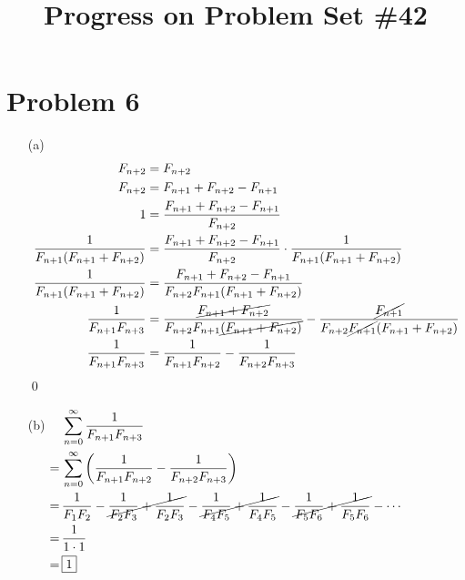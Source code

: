 \documentclass{article}
\begin{document}
\section*{Problem 6}
\begin{itemize}
\item[(a)]
\begin{align*}
	F_{n+2}&=F_{n+2} \\
	F_{n+2}&=F_{n+1}+F_{n+2}-F_{n+1} \\
	1&=\frac{F_{n+1}+F_{n+2}-F_{n+1}}{F_{n+2}} \\
	\frac{1}{F_{n+1}(F_{n+1}+F_{n+2})}&=\frac{F_{n+1}+F_{n+2}-
		F_{n+1}}{F_{n+2}}\cdot\frac{1}{F_{n+1}(F_{n+1}+F_{n+2})} \\
	\frac{1}{F_{n+1}(F_{n+1}+F_{n+2})}&=\frac{F_{n+1}+F_{n+2}-
		F_{n+1}}{F_{n+2}F_{n+1}(F_{n+1}+F_{n+2})} \\
	\frac{1}{F_{n+1}F_{n+3}}&=\frac{\cancel{F_{n+1}+F_{n+2}}}
		{F_{n+2}F_{n+1}\cancel{(F_{n+1}+F_{n+2})}}-\frac{\cancel{
		F_{n+1}}}{F_{n+2}\cancel{F_{n+1}}(F_{n+1}+F_{n+2})} \\
	\frac{1}{F_{n+1}F_{n+3}}&=\frac{1}{F_{n+1}F_{n+2}}-\frac{1}
		{F_{n+2}F_{n+3}}
\end{align*}
\qed

\item[(b)]
$\begin{aligned}[t]
	&\sum_{n=0}^{\infty}\frac{1}{F_{n+1}F_{n+3}} \\
	=\,&\sum_{n=0}^{\infty}\left(\frac{1}{F_{n+1}F_{n+2}}-
		\frac{1}{F_{n+2}F_{n+3}}\right) \\
	=\,&\frac{1}{F_1F_2}-\cancel{\frac{1}{F_2F_3}+\frac{1}{F_2F_3}}
		-\cancel{\frac{1}{F_4F_5}+\frac{1}{F_4F_5}}
		-\cancel{\frac{1}{F_5F_6}+\frac{1}{F_5F_6}}-\cdots \\
	=\,&\frac{1}{1\cdot1} \\
	=\,&\boxed{1}
\end{aligned}$

\end{itemize}

\title{Progress on Problem Set \#42}
\maketitle
\end{document}

